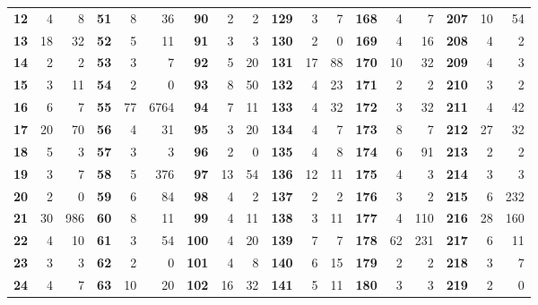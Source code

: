 \documentclass[10pt,a4paper,reqno]{amsart}
\begin{document}
\begin{table}[ht]
{{\begin{tabular}{|r|r|r||r|r|r||r|r|r||r|r|r||r|r|r||r|r|r|}
    \bf{12} & 4     & 8     & \bf{51} & 8     & 36    & \bf{90} & 2     & 2     & \bf{129} & 3     & 7     & \bf{168} & 4     & 7     &\bf{207} & 10    & 54\\
    \bf{13} & 18    & 32    & \bf{52} & 5     & 11    & \bf{91} & 3     & 3     & \bf{130} & 2     & 0     & \bf{169} & 4     & 16    & \bf{208} & 4     & 2\\
    \bf{14} & 2     & 2     & \bf{53} & 3     & 7     & \bf{92} & 5     & 20    & \bf{131} & 17    & 88    & \bf{170} & 10    & 32    & \bf{209} & 4     & 3 \\
    \bf{15} & 3     & 11    & \bf{54} & 2     & 0     & \bf{93} & 8     & 50    & \bf{132} & 4     & 23    & \bf{171} & 2     & 2     & \bf{210} & 3     & 2 \\
    \bf{16} & 6     & 7     & \bf{55} & 77    & 6764  & \bf{94} & 7     & 11    & \bf{133} & 4     & 32    & \bf{172} & 3     & 32    & \bf{211} & 4     & 42 \\
    \bf{17} & 20    & 70    & \bf{56} & 4     & 31    & \bf{95} & 3     & 20    & \bf{134} & 4     & 7     & \bf{173} & 8     & 7     &  \bf{212} & 27    & 32  \\
    \bf{18} & 5     & 3     & \bf{57} & 3     & 3     & \bf{96} & 2     & 0     & \bf{135} & 4     & 8     & \bf{174} & 6     & 91    &   \bf{213} & 2     & 2\\
    \bf{19} & 3     & 7     & \bf{58} & 5     & 376   & \bf{97} & 13    & 54    & \bf{136} & 12    & 11    & \bf{175} & 4     & 3     & \bf{214} & 3     & 3\\
    \bf{20} & 2     & 0     & \bf{59} & 6     & 84    & \bf{98} & 4     & 2     & \bf{137} & 2     & 2     & \bf{176} & 3     & 2     & \bf{215} & 6     & 232 \\
    \bf{21} & 30    & 986   & \bf{60} & 8     & 11    & \bf{99} & 4     & 11    & \bf{138} & 3     & 11    & \bf{177} & 4     & 110   & \bf{216} & 28    & 160\\
    \bf{22} & 4     & 10    & \bf{61} & 3     & 54    & \bf{100} & 4     & 20    & \bf{139} & 7     & 7     & \bf{178} & 62    & 231   &  \bf{217} & 6     & 11\\
    \bf{23} & 3     & 3     & \bf{62} & 2     & 0     & \bf{101} & 4     & 8     & \bf{140} & 6     & 15    & \bf{179} & 2     & 2     &  \bf{218} & 3     & 7\\
    \bf{24} & 4     & 7     & \bf{63} & 10    & 20    & \bf{102} & 16    & 32    & \bf{141} & 5     & 11    & \bf{180} & 3     & 3     &  \bf{219} & 2 & 0 \\

\end{tabular}}}
\end{table}
\end{document}
